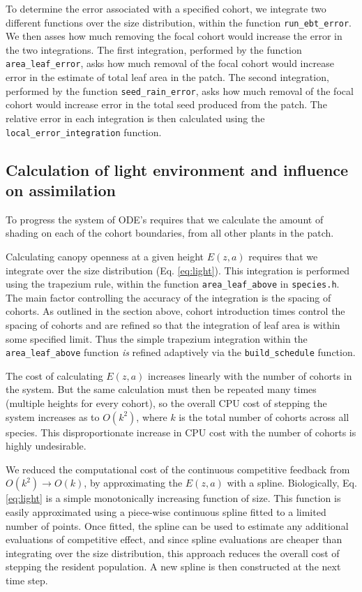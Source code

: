 \documentclass[10pt,twoside]{article}
\begin{document}
To determine the error associated with a specified cohort, we integrate
two different functions over the size distribution, within the function
\texttt{run\_ebt\_error}. We then asses how much removing the focal
cohort would increase the error in the two integrations. The first
integration, performed by the function \texttt{area\_leaf\_error}, asks
how much removal of the focal cohort would increase error in the
estimate of total leaf area in the patch. The second integration,
performed by the function \texttt{seed\_rain\_error}, asks how much
removal of the focal cohort would increase error in the total seed
produced from the patch. The relative error in each integration is then
calculated using the \texttt{local\_error\_integration} function.

\subsection{Calculation of light environment and influence on
assimilation}\label{calculation-of-light-environment-and-influence-on-assimilation}

To progress the system of ODE's requires that we calculate the amount of
shading on each of the cohort boundaries, from all other plants in the
patch.

Calculating canopy openness at a given height \(E(z,a)\) requires that
we integrate over the size distribution (Eq. \ref{eq:light}). This
integration is performed using the trapezium rule, within the function
\texttt{area\_leaf\_above} in \texttt{species.h}. The main factor
controlling the accuracy of the integration is the spacing of cohorts.
As outlined in the section above, cohort introduction times control the
spacing of cohorts and are refined so that the integration of leaf area
is within some specified limit. Thus the simple trapezium integration
within the \texttt{area\_leaf\_above} function \emph{is} refined
adaptively via the \texttt{build\_schedule} function.

The cost of calculating \(E(z,a)\) increases linearly with the number of
cohorts in the system. But the same calculation must then be repeated
many times (multiple heights for every cohort), so the overall CPU cost
of stepping the system increases as to \(O(k^2)\), where \(k\) is the
total number of cohorts across all species. This disproportionate
increase in CPU cost with the number of cohorts is highly undesirable.

We reduced the computational cost of the continuous competitive feedback
from \(O(k^2) \rightarrow O(k)\), by approximating the \(E(z,a)\) with a
spline. Biologically, Eq. \ref{eq:light} is a simple monotonically
increasing function of size. This function is easily
approximated using a piece-wise continuous spline fitted to a limited
number of points. Once fitted, the spline can be used to estimate any
additional evaluations of competitive effect, and since spline
evaluations are cheaper than integrating over the size distribution,
this approach reduces the overall cost of stepping the resident
population. A new spline is then constructed at the next time step.
\end{document}
